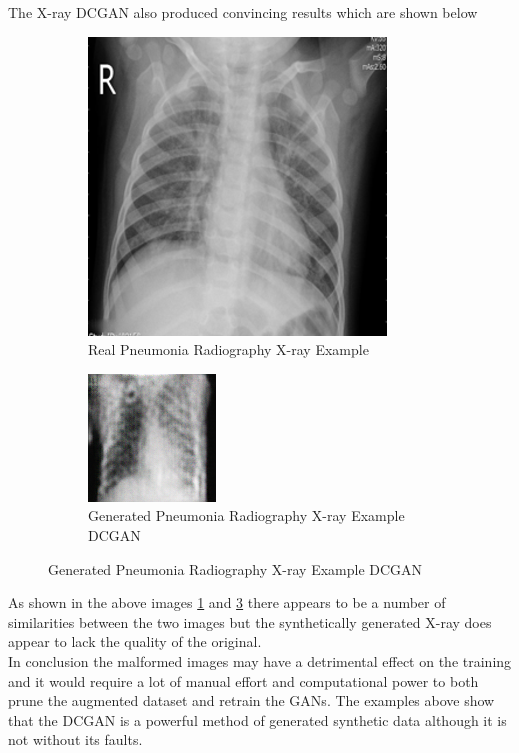 The X-ray DCGAN also produced convincing results which are shown below 
 \begin{figure}[H]
    \centering
    \begin{subfigure}{.4\textwidth}
    \centering
      \includegraphics[width=.4\linewidth,keepaspectratio]{Images/ExampleOfPneumoniaXrayRadiographyCOVID19.png}
      \caption{Real Pneumonia Radiography X-ray Example}
      \label{fig:Real Pneumonia Radiography X-ray Example}
    \end{subfigure}\hfill%
    \begin{subfigure}{.4\textwidth}
    \centering
      \includegraphics[width=.4\linewidth,keepaspectratio]{Images/ExampleOfSyntheticallyGeneratedXrayPneumoniaCOVID19RadiographyDCGAN.png}
      \caption{Generated Pneumonia Radiography X-ray Example DCGAN}
      \label{fig:Synthetically Generated Pneumonia Radiography X-ray(DCGAN)}
    \end{subfigure}\hfill%
\end{figure}
As shown in the above images \ref{fig:Real Pneumonia Radiography X-ray Example} and \ref{fig:Synthetically Generated Pneumonia Radiography X-ray(DCGAN)} there appears to be a number of similarities between the two images but the synthetically generated X-ray does appear to lack the quality of the original.
\\
In conclusion the malformed images may have a detrimental effect on the training and it would require a lot of manual effort and computational power to both prune the augmented dataset and retrain the GANs.  The examples above show that the DCGAN is a powerful method of generated synthetic data although it is not without its faults.
